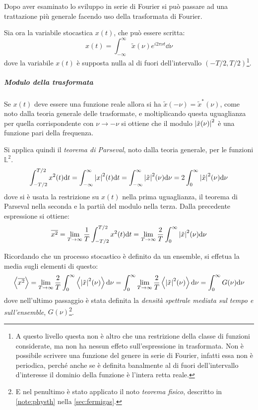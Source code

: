 Dopo aver esaminato lo sviluppo in serie di Fourier si può passare ad una trattazione più generale facendo uso della trasformata di Fourier.

Sia ora la variabile stocastica $ x(t) $, che può essere scritta:
\[ x(t) = \int_{-\infty}^{\infty} \tilde{x}(\nu) e ^{i 2\pi \nu t} \dd \nu \]
dove la variabile $ x(t) $ è supposta nulla al di fuori dell'intervallo $ (-T/2, T/2) $\footnote{A questo livello questa non è altro che una restrizione della classe di funzioni considerate, ma non ha nessun effeto sull'espressione in trasformata. Non è possibile scrivere una funzione del genere in serie di Fourier, infatti essa non è periodica, perché anche se è definita banalmente al di fuori dell'intervallo d'interesse il dominio della funzione è l'intera retta reale.}.

\subparagraph{Modulo della trasformata}	Se $ x(t) $ deve essere una funzione reale allora si ha $ \tilde{x}(-\nu) = \tilde{x}^\ast(\nu) $, come noto dalla teoria generale delle trasformate, e moltiplicando questa uguaglianza per quella corrispondente con $ \nu \rightarrow - \nu $ si ottiene che il modulo $ \abs{\tilde{x}(\nu)}^2 $ è una funzione pari della frequenza.
\newline

Si applica quindi il \textit{teorema di Parseval}, noto dalla teoria generale, per le funzioni $ \mathbb{L}^2 $.
\[ \int_{-T/2}^{T/2} x^2(t) \dd t = \int_{-\infty}^{\infty} \abs{x}^2(t) \dd t = \int_{-\infty}^{\infty} \abs{\tilde{x}}^2(\nu) \dd \nu = 2 \int_{0}^{\infty} \abs{\tilde{x}}^2(\nu) \dd \nu \]
dove si è usata la restrizione su $ x(t) $ nella prima uguaglianza, il teorema di Parseval nella seconda e la partià del modulo nella terza. Dalla precedente espressione si ottiene:
\[ \overline{x^2} = \lim\limits_{T \rightarrow \infty} \frac{1}{T} \int_{-T/2}^{T/2} x^2(t) \dd t = \lim\limits_{T \rightarrow \infty} \frac{2}{T} \int_{0}^{\infty} \abs{\tilde{x}}^2(\nu) \dd \nu \]

Ricordando che un processo stocastico è definito da un ensemble, si effetua la media sugli elementi di questo:
\[ \expval{\overline{x^2}} = \lim\limits_{T \rightarrow \infty} \frac{2}{T} \int_{0}^{\infty} \expval{\abs{\tilde{x}}^2(\nu)} \dd \nu = \int_{0}^{\infty} \lim\limits_{T \rightarrow \infty} \frac{2}{T} \expval{\abs{\tilde{x}}^2(\nu)} \dd \nu  = \int_{0}^\infty G(\nu) \dd \nu \]
dove nell'ultimo passaggio è stata definita la \textit{densità spettrale mediata sul tempo e sull'ensemble}, $ G(\nu) $\footnote{E nel penultimo è stato applicato il noto \textit{teorema fisico}, descritto in \cref{note:physth} nella \cref{sec:fermigas}.}.


